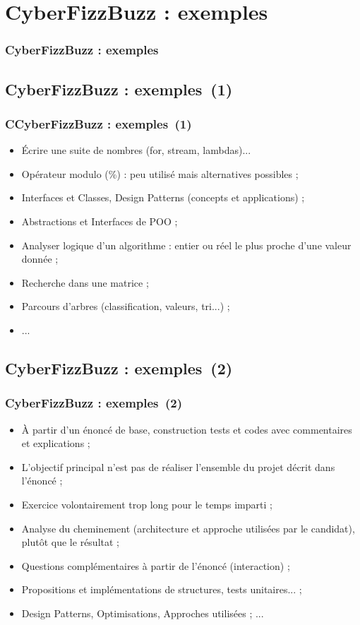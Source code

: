 \documentclass[slidetop,11pt]{beamer}
\begin{document}
\def\titleExemplesCyberFizzBuzz{CyberFizzBuzz : exemples}
\section{\titleExemplesCyberFizzBuzz }
\begin{frame}
	\frametitle{\titleExemplesCyberFizzBuzz }
	\tableofcontents[sections=3,currentsection,subsectionstyle=show/shaded/hide]
\end{frame} 

\subsection{\titleExemplesCyberFizzBuzz ~(1)}
\begin{frame}
	\frametitle{C\titleExemplesCyberFizzBuzz ~(1)}
	\begin{itemize}
		\item {\'E}crire une suite de nombres (for, stream, lambdas)...
		\item Op{\'e}rateur modulo (\%) : peu utilis{\'e} mais alternatives possibles ; 
		\item Interfaces et Classes, Design Patterns (concepts et applications) ; 
		\item Abstractions et Interfaces de POO ; 
		\item Analyser logique d'un algorithme : entier ou r{\'e}el le plus proche d'une valeur donn{\'e}e ; 
		\item Recherche dans une matrice ; 
		\item Parcours d'arbres (classification, valeurs, tri...) ; 
		\item ... 
	\end{itemize}
\end{frame} 

\subsection{\titleExemplesCyberFizzBuzz ~(2)}
\begin{frame}
	\frametitle{\titleExemplesCyberFizzBuzz ~(2)}
	\begin{itemize}
		\item {\`A} partir d'un {\'e}nonc{\'e} de base, construction tests et codes avec commentaires et explications ; 
		\item L'objectif principal n'est pas de r{\'e}aliser l'ensemble du projet d{\'e}crit dans l'{\'e}nonc{\'e} ; 
		\item Exercice volontairement trop long pour le temps imparti ; 
		\item Analyse du cheminement (architecture et approche utilis{\'e}es par le candidat), plut{\^o}t que le r{\'e}sultat ;
		\item Questions compl{\'e}mentaires {\`a} partir de l'{\'e}nonc{\'e} (interaction) ; 
		\item Propositions et impl{\'e}mentations de structures, tests unitaires... ;
		\item Design Patterns, Optimisations, Approches utilis{\'e}es ; ... 
	\end{itemize}
\end{frame} 
\end{document}
